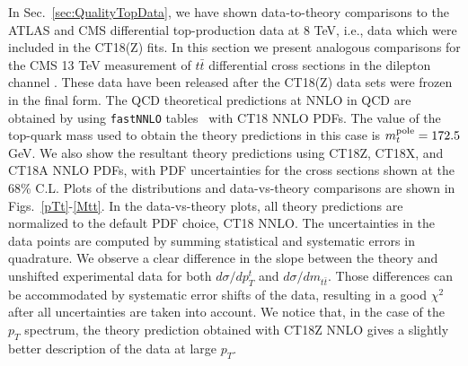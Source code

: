 In Sec.~\ref{sec:QualityTopData}, we have shown data-to-theory comparisons to the ATLAS and CMS differential top-production data at 8 TeV, i.e., data which were included in the CT18(Z) fits. In this section we present analogous comparisons for the CMS 13 TeV measurement of $t\bar t$ differential cross 
sections in the dilepton channel \cite{Sirunyan:2018ucr}. These data have been released after the CT18(Z) data sets were frozen in the final form. The QCD theoretical predictions at NNLO in QCD are obtained by using \texttt{fastNNLO} tables~\cite{fastnnlo:grids} with CT18 NNLO PDFs. The value of the top-quark mass used to obtain the theory predictions in this case is $m_t^{\rm pole}=172.5$ GeV.
We also show the resultant theory predictions using CT18Z, CT18X, and CT18A NNLO PDFs,
with PDF uncertainties for the cross sections shown at the 68\% C.L.
Plots of the distributions and data-vs-theory comparisons are shown in Figs.~\ref{pTt}-\ref{Mtt}. 
In the data-vs-theory plots, all theory predictions are normalized to the default PDF choice, CT18 NNLO. 
The uncertainties in the data points are computed by summing statistical and systematic errors in quadrature.
We observe a clear difference in the slope between the theory and unshifted experimental data for both $d\sigma / dp^t_T$ and $d\sigma / dm_{t\bar{t}}$.
Those differences can be accommodated by systematic error shifts of the data, resulting in a good $\chi^2$ after all uncertainties are taken into account.
We notice that, in the case of the $p_T$ spectrum, the theory prediction obtained with CT18Z NNLO gives a slightly better description of the data at large $p_T$.


%


